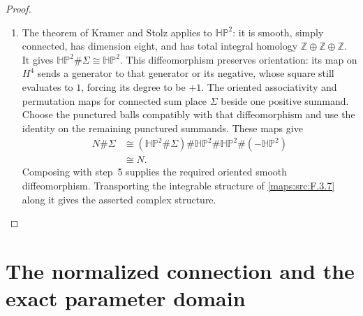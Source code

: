 \documentclass[11pt,a4paper]{article}
\numberwithin{equation}{section}
\theoremstyle{definition}
\begin{document}
\begin{proof}
\begin{enumerate}[label=\arabic*.]
\item The theorem of Kramer and Stolz
\cite[Theorem~A, p.~178]{IVVKramerStolz} applies to
$\mathbb H\mathbb P^2$: it is smooth, simply connected, has dimension
eight, and has total integral homology $\mathbb Z\oplus\mathbb Z
\oplus\mathbb Z$. It gives
$\mathbb H\mathbb P^2\#\Sigma\cong\mathbb H\mathbb P^2$.
This diffeomorphism preserves orientation: its map on $H^4$ sends
a generator to that generator or its negative, whose square still
evaluates to $1$, forcing its degree to be $+1$.
The oriented associativity and permutation maps for connected sum
place $\Sigma$ beside one positive summand. Choose the punctured
balls compatibly with that diffeomorphism and use the identity on
the remaining punctured summands. These maps give
\[
\begin{aligned}
N\#\Sigma
&\cong(\mathbb H\mathbb P^2\#\Sigma)\#\mathbb H\mathbb P^2
       \#\mathbb H\mathbb P^2\#(-\mathbb H\mathbb P^2)\\
&\cong N.
\end{aligned}
\]
Composing with step~5 supplies the required oriented smooth
diffeomorphism. Transporting the integrable structure of
\cref{maps:src:F.3.7} along it gives the asserted complex structure.
\end{enumerate}
\end{proof}


\section{The normalized connection and the exact parameter domain}\label{pub:V:sec-parameter}
\end{document}
